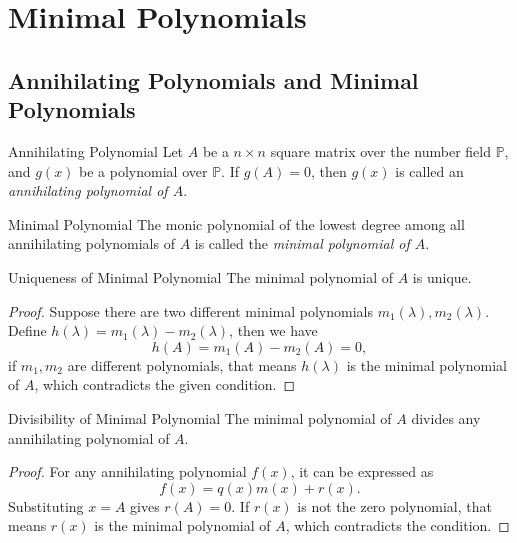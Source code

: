 \section{Minimal Polynomials}

\subsection{Annihilating Polynomials and Minimal Polynomials}

\begin{definition}{Annihilating Polynomial}{}
  Let $A$ be a $n\times n$ square matrix over the number field $\mathbb{P}$,
  and $g(x)$ be a polynomial over $\mathbb{P}$.
  If $g(A) = 0$, then $g(x)$ is called an \emph{annihilating polynomial of $A$}.
\end{definition}

\begin{definition}{Minimal Polynomial}{}
  The monic polynomial of the lowest degree among all annihilating polynomials
  of $A$ is called the \emph{minimal polynomial of $A$}.
\end{definition}

\begin{proposition}{Uniqueness of Minimal Polynomial}{}
  The minimal polynomial of $A$ is unique.
\end{proposition}

\begin{proof}
  Suppose there are two different minimal polynomials $m_1(\lambda),
  m_2(\lambda)$.
  Define $h(\lambda) = m_1(\lambda) - m_2(\lambda)$,
  then we have
  \begin{equation}
    h(A) = m_1(A) - m_2(A) = 0,
  \end{equation}
  if $m_1, m_2$ are different polynomials, that means $h(\lambda)$ is the
  minimal polynomial of $A$, which contradicts the given condition.
\end{proof}

\begin{proposition}{Divisibility of Minimal Polynomial}{}
  The minimal polynomial of $A$ divides any annihilating polynomial of $A$.
\end{proposition}

\begin{proof}
  For any annihilating polynomial $f(x)$, it can be expressed as
  \begin{equation}
    f(x) = q(x) m(x) + r(x).
  \end{equation}
  Substituting $x = A$ gives $r(A) = 0$.
  If $r(x)$ is not the zero polynomial, that means $r(x)$ is the minimal
  polynomial of $A$, which contradicts the condition.
\end{proof}

